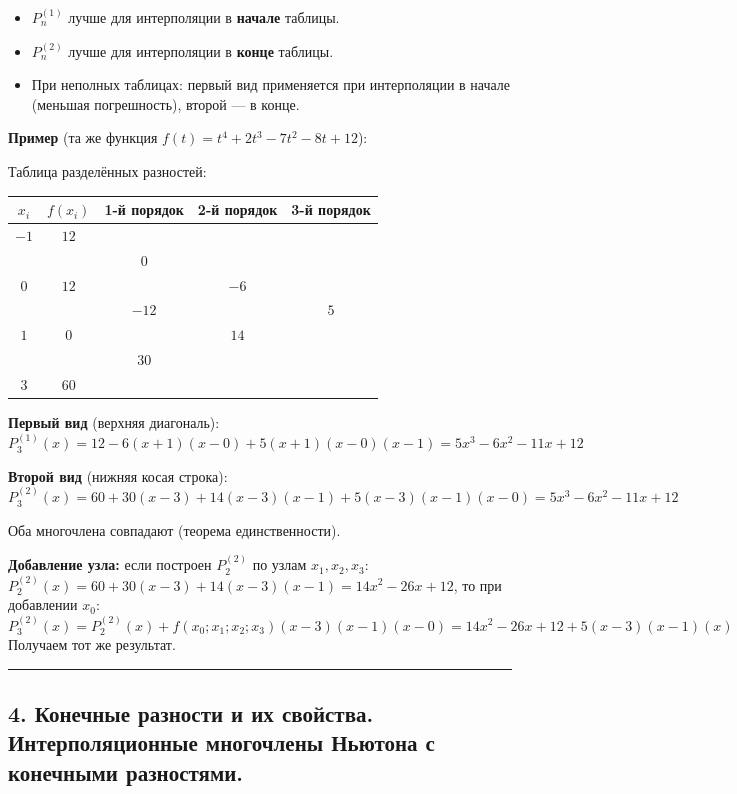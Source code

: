 \documentclass[14pt,a4paper]{extarticle}
\begin{document}
\begin{itemize}
    \item $P_n^{(1)}$ лучше для интерполяции в \textbf{начале} таблицы.
    \item $P_n^{(2)}$ лучше для интерполяции в \textbf{конце} таблицы.
    \item При неполных таблицах: первый вид применяется при интерполяции в начале (меньшая погрешность), второй --- в конце.
\end{itemize}

\textbf{Пример} (та же функция $f(t) = t^4 + 2t^3 - 7t^2 - 8t + 12$):

Таблица разделённых разностей:

\begin{center}
\begin{tabular}{c|c|c|c|c}
\toprule
$x_i$ & $f(x_i)$ & 1-й порядок & 2-й порядок & 3-й порядок \\
\midrule
$-1$ & $12$ & & & \\
& & $0$ & & \\
$0$ & $12$ & & $-6$ & \\
& & $-12$ & & $5$ \\
$1$ & $0$ & & $14$ & \\
& & $30$ & & \\
$3$ & $60$ & & & \\
\bottomrule
\end{tabular}
\end{center}

\textbf{Первый вид} (верхняя диагональ):
\[P_3^{(1)}(x) = 12 - 6(x + 1)(x - 0) + 5(x + 1)(x - 0)(x - 1) = 5x^3 - 6x^2 - 11x + 12\]

\textbf{Второй вид} (нижняя косая строка):
\[P_3^{(2)}(x) = 60 + 30(x - 3) + 14(x - 3)(x - 1) + 5(x - 3)(x - 1)(x - 0) = 5x^3 - 6x^2 - 11x + 12\]

Оба многочлена совпадают (теорема единственности).

\textbf{Добавление узла:} если построен $P_2^{(2)}$ по узлам $x_1, x_2, x_3$: $P_2^{(2)}(x) = 60 + 30(x-3) + 14(x-3)(x-1) = 14x^2 - 26x + 12$, то при добавлении $x_0$:
\[P_3^{(2)}(x) = P_2^{(2)}(x) + f(x_0; x_1; x_2; x_3)(x - 3)(x - 1)(x - 0) = 14x^2 - 26x + 12 + 5(x-3)(x-1)(x)\]
Получаем тот же результат.

\hrule\bigskip

\subsection{4. Конечные разности и их свойства. Интерполяционные многочлены Ньютона с конечными разностями.}
\end{document}
